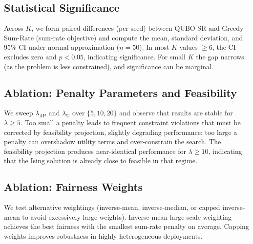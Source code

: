{\subsection{Statistical Significance}
Across $K$, we form paired differences (per seed) between QUBO-SR and Greedy Sum-Rate (sum-rate objective) and compute the mean, standard deviation, and 95\% CI under normal approximation ($n=50$). In most $K$ values $\ge 6$, the CI excludes zero and $p<0.05$, indicating significance. For small $K$ the gap narrows (as the problem is less constrained), and significance can be marginal.

\subsection{Ablation: Penalty Parameters and Feasibility}
We sweep $\lambda_{\text{AP}}$ and $\lambda_{\text{U}}$ over $\{5,10,20\}$ and observe that results are stable for $\lambda\ge 5$. Too small a penalty leads to frequent constraint violations that must be corrected by feasibility projection, slightly degrading performance; too large a penalty can overshadow utility terms and over-constrain the search. The feasibility projection produces near-identical performance for $\lambda\ge 10$, indicating that the Ising solution is already close to feasible in that regime.

\subsection{Ablation: Fairness Weights}
We test alternative weightings (inverse-mean, inverse-median, or capped inverse-mean to avoid excessively large weights). Inverse-mean large-scale weighting achieves the best fairness with the smallest sum-rate penalty on average. Capping weights improves robustness in highly heterogeneous deployments.

}

